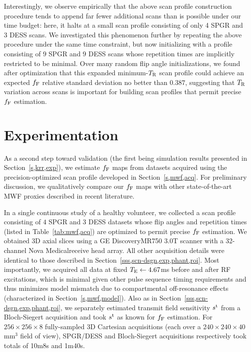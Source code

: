 Interestingly,
we observe empirically
that the above scan profile construction procedure
tends to append far fewer additional scans
than is possible under our time budget: 
here, it halts at a small scan profile
consisting of only 4 SPGR and 3 DESS scans. 
We investigated this phenomenon further
by repeating the above procedure
under the same time constraint,
but now initializing with a profile
consisting of $9$ SPGR and $9$ DESS scans
whose repetition times are implicitly restricted
to be minimal. 
Over many random flip angle initializations,
we found after optimization
that this expanded minimum-$T_\mathrm{R}$ scan profile could achieve
an expected $f_{\mathrm{F}}$ relative standard deviation
no better than $0.387$,
suggesting that $T_\mathrm{R}$ variation 
across scans is important 
for building scan profiles
that permit precise $f_{\mathrm{F}}$ estimation.

\section{Experimentation}
\label{s,mwf,exp}

As a second step toward validation
(the first being simulation results 
presented in Section~\ref{s,krr,exp}),
we estimate $f_{\mathrm{F}}$ maps
from \invivo datasets acquired
using the precision-optimized scan profile
developed in Section~\ref{s,mwf,acq}.
For preliminary discussion,
we qualitatively compare our $f_{\mathrm{F}}$ maps 
with other state-of-the-art MWF proxies
described in recent literature.

In a single continuous study
of a healthy volunteer,
we collected a scan profile 
consisting of $4$ SPGR and $3$ DESS datasets
whose flip angles and repetition times
(listed in Table~\ref{tab:mwf,acq}) 
are optimized 
to permit precise $f_{\mathrm{F}}$ estimation. 
We obtained 3D axial slices 
using a GE Discovery\tmark MR750 3.0T scanner
with a 32-channel Nova Medical\regis receive head array.
All other acquisition details were identical
to those described in Section~\ref{sss,scn-dsgn,exp,phant,roi}.
Most importantly,
we acquired all data 
at fixed $T_\mathrm{E} \gets 4.67$ms
before and after RF excitations,
which is minimal
given other pulse sequence timing requirements
and thus minimizes model mismatch 
due to compartmental off-resonance effects
(characterized in Section~\ref{s,mwf,model}).
Also as in Section~\ref{sss,scn-dsgn,exp,phant,roi},
we separately estimated
transmit field sensitivity $s^{\mathrm{t}}$
from a Bloch-Siegert acquisition \cite{sacolick:10:bmb}
and took $s^{\mathrm{t}}$ as known
for $f_{\mathrm{F}}$ estimation.
For $256\times256\times8$ fully-sampled 3D Cartesian acquisitions
(each over a $240\times240\times40$mm$^3$ field of view),
SPGR/DESS and Bloch-Siegert acquisitions respectively took totals
of 10m8s and 1m40s. 

